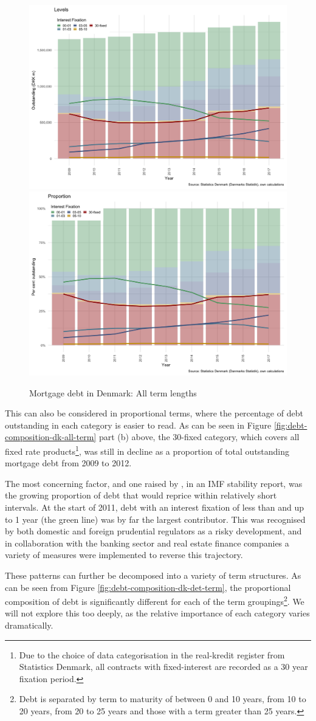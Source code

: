 \documentclass[
]{book}
\begin{document}
\begin{figure}[H]
\includegraphics[width=0.5\linewidth]{figures/unnamed-chunk-2-1} \includegraphics[width=0.5\linewidth]{figures/unnamed-chunk-2-2} \caption{Mortgage debt in Denmark: All term lengths}\label{fig:unnamed-chunk-2}
\end{figure}

This can also be considered in proportional terms, where the percentage of debt outstanding in
each category is easier to read. As can be seen in Figure \ref{fig:debt-composition-dk-all-term} part (b) above,
the 30-fixed category, which covers all fixed rate products\footnote{Due to the choice of data categorisation in the real-kredit register from Statistics Denmark, all contracts with fixed-interest are recorded as a 30 year fixation period.}, was still in decline as a proportion of total outstanding mortgage debt from 2009 to 2012.

The most concerning factor, and one raised by \citet{sheehy2014}, in an IMF stability report, was the growing proportion of debt that would reprice within relatively short intervals. At the start of 2011, debt with an interest fixation of less than and up to 1 year (the green line) was by far the largest contributor. This was recognised by both domestic and foreign prudential regulators as a risky development, and in collaboration with the banking sector and real estate finance companies a variety of measures were implemented to reverse this trajectory. \citep{sheehy2014}

These patterns can further be decomposed into a variety of term structures.
As can be seen from Figure \ref{fig:debt-composition-dk-det-term}, the
proportional composition of debt is significantly different for each of the
term groupings\footnote{Debt is separated by term to maturity of between 0
  and 10 years, from 10 to 20 years, from 20 to 25 years and those with a term
  greater than 25 years.}. We will not explore this too deeply, as the
relative importance of each category varies dramatically.
\end{document}
